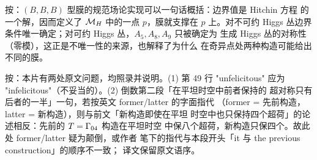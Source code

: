 \begin{yizhu}[物理图像]
按：$(B,B,B)$ 型膜的规范场论实现可以一句话概括：边界值是 Hitchin 方程
的一个解，因而定义了 ${{{\mathcal{M}}}_H}$ 中的一点 $p$，膜就支撑在 $p$ 上。对不可约
Higgs 丛边界条件唯一确定；对可约 Higgs 丛，$A_5,A_8,A_9$ 只被确定为
生成 Higgs 丛的对称性（零模），这正是不唯一性的来源，也解释了为什么
在奇异点处两种构造可能给出不同的膜。
\end{yizhu}

\begin{yizhu}[原文疑误]
按：本片有两处原文问题，均照录并说明。(1) 第 49 行 "unfelicitous" 应为
"infelicitous"（不妥当的）。(2) 倒数第二段「在平坦时空中前者保持的
超对称只有后者的一半」一句，若按英文 former/latter 的字面指代
（former = 先前构造，latter = 新构造），则与前文「新构造即使在平坦
时空中也只保持四个超荷」的论述相反：先前的 $T={\Gamma}_{04}$ 构造在平坦时空
中保八个超荷，新构造只保四个。故此处 former/latter 疑为颠倒，或作者
笔下的指代与本段开头「it 与 the previous construction」的顺序不一致；
译文保留原文语序。
\end{yizhu}
